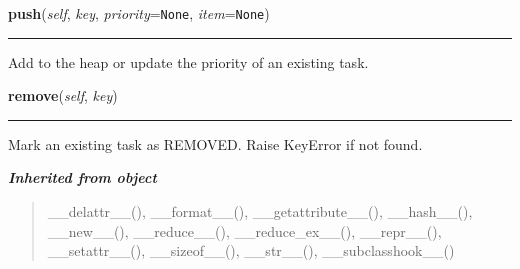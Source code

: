     \label{coinor:blimpy:Queues:PriorityQueue:push}

    \vspace{0.5ex}

\hspace{.8\funcindent}\begin{boxedminipage}{\funcwidth}

    \raggedright \textbf{push}(\textit{self}, \textit{key}, \textit{priority}={\tt None}, \textit{item}={\tt None})

    \vspace{-1.5ex}

    \rule{\textwidth}{0.5\fboxrule}
\setlength{\parskip}{2ex}
    Add to the heap or update the priority of an existing task.

\setlength{\parskip}{1ex}
    \end{boxedminipage}

    \label{coinor:blimpy:Queues:PriorityQueue:remove}

    \vspace{0.5ex}

\hspace{.8\funcindent}\begin{boxedminipage}{\funcwidth}

    \raggedright \textbf{remove}(\textit{self}, \textit{key})

    \vspace{-1.5ex}

    \rule{\textwidth}{0.5\fboxrule}
\setlength{\parskip}{2ex}
    Mark an existing task as REMOVED.  Raise KeyError if not found.

\setlength{\parskip}{1ex}
    \end{boxedminipage}


\large{\textbf{\textit{Inherited from object}}}

\begin{quote}
\_\_delattr\_\_(), \_\_format\_\_(), \_\_getattribute\_\_(), \_\_hash\_\_(), \_\_new\_\_(), \_\_reduce\_\_(), \_\_reduce\_ex\_\_(), \_\_repr\_\_(), \_\_setattr\_\_(), \_\_sizeof\_\_(), \_\_str\_\_(), \_\_subclasshook\_\_()
\end{quote}

